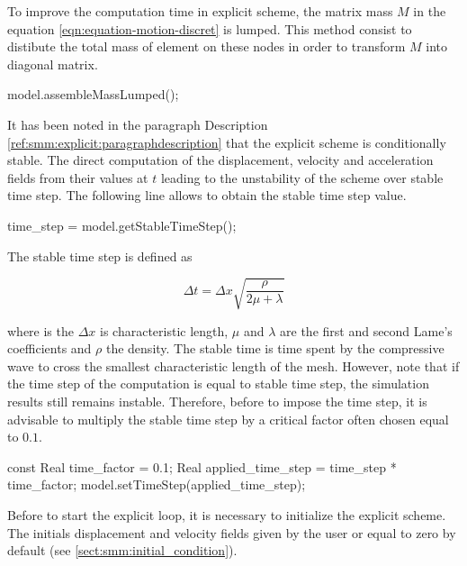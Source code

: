 \documentclass[a4paper,11pt]{book}
\begin{document}
To improve the computation time in explicit scheme, the matrix mass $M$ in 
the equation \ref{eqn:equation-motion-discret} is lumped. 
This method consist to distibute the total mass of element on these nodes 
in order to transform $M$ into diagonal matrix.

\begin{cpp}
  model.assembleMassLumped();
\end{cpp}

It has been noted in the paragraph Description 
\ref{ref:smm:explicit:paragraphdescription} that the explicit scheme is 
conditionally stable. 
The direct computation of the displacement, velocity and acceleration fields 
from their values at $t$ leading to the unstability of the scheme over stable 
time step. 
The following line allows to obtain the stable time step value.

\begin{cpp}
  time_step = model.getStableTimeStep();
\end{cpp}

The stable time step is defined as

\begin{equation}
  \Delta t = \Delta x \sqrt{\frac{\rho}{2 \mu +\lambda}}
\end{equation}
\label{eqn:smm:explicit:stabletime}

where is the $\Delta x$ is characteristic length, $\mu$ and $\lambda$ are the 
first and second Lame's coefficients and $\rho$ the density. The stable time is 
time spent by the compressive wave to cross the smallest characteristic length of 
the mesh. 
However, note that if the time step of the computation is equal to stable time step, 
the simulation results still remains instable. 
Therefore, before to impose the time step, it is advisable to multiply the stable 
time step by a critical factor often chosen equal to $0.1$.

\begin{cpp}
  const Real time_factor = 0.1;
  Real applied_time_step = time_step * time_factor;
  model.setTimeStep(applied_time_step);
\end{cpp}

Before to start the explicit loop, it is necessary to initialize the explicit scheme. 
The initials displacement and velocity fields given by the user or equal to zero by 
default (see \ref{sect:smm:initial_condition}).
\end{document}
